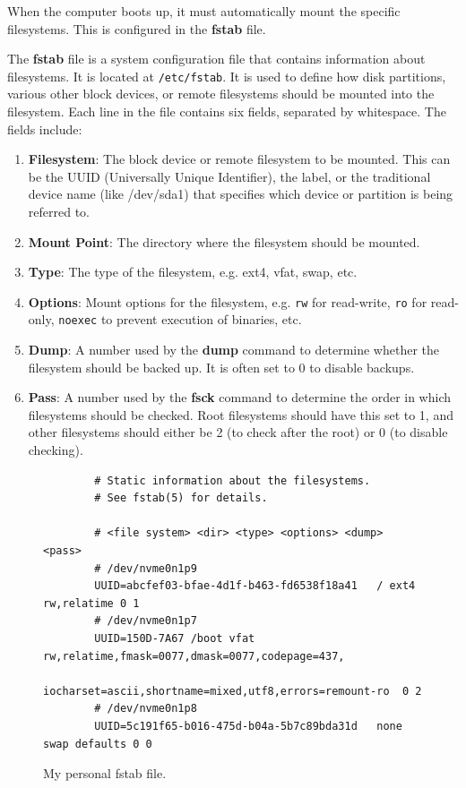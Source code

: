 \documentclass{article}
\newcounter{definition}[section]
\newcounter{code}[section]
\begin{document}
    When the computer boots up, it must automatically mount the specific filesystems. This is configured in the \textbf{fstab} file. 

    \begin{definition}[fstab]
      \label{def:fstab}
      The \textbf{fstab} file is a system configuration file that contains information about filesystems. It is located at \texttt{/etc/fstab}. It is used to define how disk partitions, various other block devices, or remote filesystems should be mounted into the filesystem. 
      Each line in the file contains six fields, separated by whitespace. The fields include: 
      \begin{enumerate} 
        \item \textbf{Filesystem}: The block device or remote filesystem to be mounted. This can be the UUID (Universally Unique Identifier), the label, or the traditional device name (like /dev/sda1) that specifies which device or partition is being referred to.
        \item \textbf{Mount Point}: The directory where the filesystem should be mounted. 
        \item \textbf{Type}: The type of the filesystem, e.g. ext4, vfat, swap, etc.
        \item \textbf{Options}: Mount options for the filesystem, e.g. \texttt{rw} for read-write, \texttt{ro} for read-only, \texttt{noexec} to prevent execution of binaries, etc.
        \item \textbf{Dump}: A number used by the \textbf{dump} command to determine whether the filesystem should be backed up. It is often set to $0$ to disable backups. 
        \item \textbf{Pass}: A number used by the \textbf{fsck} command to determine the order in which filesystems should be checked. Root filesystems should have this set to 1, and other filesystems should either be 2 (to check after the root) or 0 (to disable checking). 
      \end{enumerate}
    \end{definition}
    \begin{figure}[hbt!]
      \centering 
      \begin{lstlisting} 
        # Static information about the filesystems.
        # See fstab(5) for details.

        # <file system> <dir> <type> <options> <dump> <pass>
        # /dev/nvme0n1p9
        UUID=abcfef03-bfae-4d1f-b463-fd6538f18a41	/ ext4 rw,relatime 0 1
        # /dev/nvme0n1p7
        UUID=150D-7A67 /boot vfat rw,relatime,fmask=0077,dmask=0077,codepage=437,
            iocharset=ascii,shortname=mixed,utf8,errors=remount-ro	0 2
        # /dev/nvme0n1p8
        UUID=5c191f65-b016-475d-b04a-5b7c89bda31d	none swap defaults 0 0
      \end{lstlisting}
      \caption{My personal fstab file.} 
      \label{fig:fstab}
    \end{figure}
\end{document}
